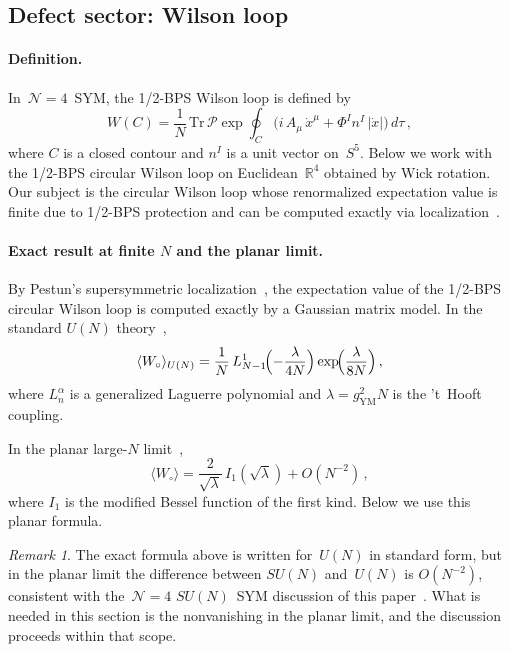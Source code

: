 \documentclass[
  aps,
  prd,
  preprint,
  groupedaddress,
  nofootinbib,
  longbibliography
]{revtex4-2}
\theoremstyle{remark}
\newtheorem{remark}[definition]{Remark}
\newcommand{\N}{\mathcal{N}}
\begin{document}
\subsection{Defect sector: Wilson loop}\label{subsec:6-2}

\paragraph{Definition.}
In~$\N=4$~SYM, the 1/2-BPS Wilson loop is defined
by~\cite{ref28,ref29,ref30,ref31}
\begin{equation}\label{eq:Wilson-def}
  W(C) = \frac{1}{N}\,\mathrm{Tr}\,\mathcal{P}
  \exp\oint_C
  \!\bigl(i\,A_\mu\,\dot{x}^\mu
    +\Phi^I n^I\,|\dot{x}|\bigr)\,d\tau\,,
\end{equation}
where $C$ is a closed contour and $n^I$ is a unit vector
on~$S^5$.
Below we work with the 1/2-BPS circular Wilson loop on
Euclidean~$\mathbb{R}^4$ obtained by Wick rotation.
Our subject is the circular Wilson loop whose renormalized
expectation value is finite due to 1/2-BPS protection and can be
computed exactly via
localization~\cite{ref29,ref30,ref31}.

\paragraph{Exact result at finite $N$ and the planar limit.}
By Pestun's supersymmetric
localization~\cite{ref31}, the expectation value of the 1/2-BPS
circular Wilson loop is computed exactly by a Gaussian matrix
model.
In the standard $U(N)$ theory~\cite{ref29,ref30,ref31},
\begin{equation}\label{eq:Wilson-exact}
  \langle W_\circ\rangle_{U(N)}
  = \frac{1}{N}\,L_{N-1}^{1}\!\Bigl(-\frac{\lambda}{4N}\Bigr)
    \exp\!\Bigl(\frac{\lambda}{8N}\Bigr)\,,
\end{equation}
where $L_n^\alpha$ is a generalized Laguerre polynomial and
$\lambda=g_{\mathrm{YM}}^2 N$ is the 't~Hooft coupling.

In the planar large-$N$
limit~\cite{ref29,ref30},
\begin{equation}\label{eq:Wilson-planar}
  \langle W_\circ\rangle
  = \frac{2}{\sqrt{\lambda}}\,I_1(\sqrt{\lambda})
    +O(N^{-2})\,,
\end{equation}
where $I_1$ is the modified Bessel function of the first kind.
Below we use this planar formula.

\begin{remark}\label{rem:SU-vs-U}
The exact formula above is written for~$U(N)$ in standard form,
but in the planar limit the difference between $SU(N)$
and~$U(N)$ is $O(N^{-2})$, consistent with the~$\N=4$
$SU(N)$~SYM discussion of this
paper~\cite{ref29,ref30,ref31}.
What is needed in this section is the nonvanishing in the planar
limit, and the discussion proceeds within that scope.
\end{remark}
\end{document}
